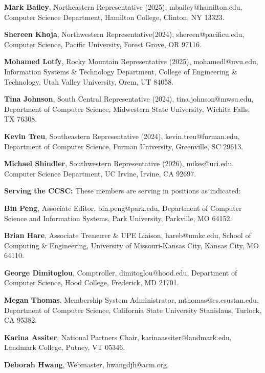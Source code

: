 \documentclass{article}
\begin{document}
\begin{multicols}{2}
\begin{raggedright}
{\noindent
\textbf{Mark Bailey}, Northeastern Representative (2025), mbailey@hamilton.edu, Computer Science Department, Hamilton College, Clinton, NY 13323.

\noindent
\textbf{Shereen Khoja},	Northwestern Representative(2024), shereen@pacificu.edu,
Computer Science, Pacific University, Forest Grove, OR 97116.

\noindent
\textbf{Mohamed Lotfy}, Rocky Mountain Representative (2025),
mohamedl@uvu.edu, Information Systems \& Technology Department,
College of Engineering \& Technology, Utah Valley University, Orem, UT 84058.

\noindent
\textbf{Tina Johnson}, South Central Representative (2024),
tina.johnson@mwsu.edu, Department of Computer Science, Midwestern State University, Wichita Falls, TX 76308.

\noindent
\textbf{Kevin Treu}, Southeastern Representative (2024),
kevin.treu@furman.edu, Department of Computer Science, Furman University, Greenville,
SC 29613.

\noindent
\textbf{Michael Shindler}, Southwestern Representative (2026),
mikes@uci.edu, Computer Science Department, UC Irvine, Irvine, CA 92697.

\clearpage
\vspace{0.2in}
\noindent
\textbf{Serving the CCSC:} These members are serving in positions as indicated:

\noindent
\textbf{Bin Peng}, Associate Editor,
bin.peng@park.edu, Department of Computer Science and
Information Systems, Park University, Parkville, MO 64152.

\noindent
\textbf{Brian Hare}, Associate Treasurer \& UPE Liaison, hareb@umkc.edu,
School of Computing \& Engineering, University of Missouri-Kansas City, Kansas City, MO 64110.

\noindent
\textbf{George Dimitoglou}, Comptroller,
dimitoglou@hood.edu,
Department of Computer Science, Hood College, Frederick, MD 21701.

\noindent
\textbf{Megan Thomas}, Membership System Administrator,
mthomas@cs.csustan.edu, Department of Computer Science, California State University Stanislaus, Turlock, CA 95382.

\noindent
\textbf{Karina Assiter}, National Partners Chair, karinaassiter@landmark.edu, Landmark College, Putney, VT 05346.

\noindent
\textbf{Deborah Hwang}, Webmaster, hwangdjh@acm.org.

} %

\end{raggedright}
\end{multicols}
\end{document}
